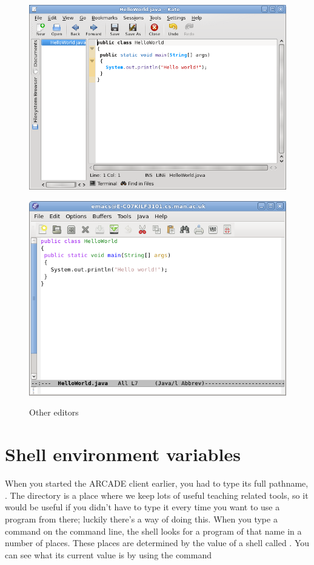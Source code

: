 \begin{figure}
  \begin{minipage}[b]{.5\linewidth}
    \centering
    \includegraphics[width=.8\textwidth]{images/kate}  
    \label{subfig:kate}
  \end{minipage}%
  \begin{minipage}[b]{.5\linewidth}
    \centering
    \includegraphics[width=.8\textwidth]{images/emacs}
    \label{subfig:emacs}
  \end{minipage}%
  \caption{Other editors}  \label{fig:texteditors}
  
\end{figure}

\section{Shell environment variables}

When you started the ARCADE client earlier, you had to type its full
pathname, . The directory
 is a place where we keep lots of useful
teaching related tools, so it would be useful if you didn't have to
type it every time you want to use a program from there; luckily
there's a way of doing this. When you type a command on the command
line, the shell looks for a program of that name in a number of
places. These places are determined by the value of a shell
 called
. You can see what its current value is by using the
command

